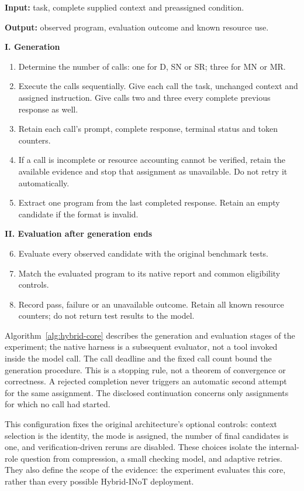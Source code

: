 \begin{algorithm}[htbp]
\caption{Program generation and outcome evaluation}
\label{alg:hybrid-core}
\small
\textbf{Input:} task, complete supplied context and preassigned condition.\par
\textbf{Output:} observed program, evaluation outcome and known resource use.\par\medskip
\textbf{I. Generation}
\begin{enumerate}\setlength{\itemsep}{2pt}\setlength{\parsep}{0pt}
\item Determine the number of calls: one for D, SN or SR; three for MN or MR.
\item Execute the calls sequentially. Give each call the task, unchanged context and assigned instruction. Give calls two and three every complete previous response as well.
\item Retain each call's prompt, complete response, terminal status and token counters.
\item If a call is incomplete or resource accounting cannot be verified, retain the available evidence and stop that assignment as unavailable. Do not retry it automatically.
\item Extract one program from the last completed response. Retain an empty candidate if the format is invalid.
\end{enumerate}
\textbf{II. Evaluation after generation ends}
\begin{enumerate}\setcounter{enumi}{5}\setlength{\itemsep}{2pt}\setlength{\parsep}{0pt}
\item Evaluate every observed candidate with the original benchmark tests.
\item Match the evaluated program to its native report and common eligibility controls.
\item Record pass, failure or an unavailable outcome. Retain all known resource counters; do not return test results to the model.
\end{enumerate}
\end{algorithm}

Algorithm~\ref{alg:hybrid-core} describes the generation and evaluation stages of the experiment; the native harness is a subsequent evaluator, not a tool invoked inside the model call. The call deadline and the fixed call count bound the generation procedure. This is a stopping rule, not a theorem of convergence or correctness. A rejected completion never triggers an automatic second attempt for the same assignment. The disclosed continuation concerns only assignments for which no call had started.

This configuration fixes the original architecture's optional controls: context selection is the identity, the mode is assigned, the number of final candidates is one, and verification-driven reruns are disabled. These choices isolate the internal-role question from compression, a small checking model, and adaptive retries. They also define the scope of the evidence: the experiment evaluates this core, rather than every possible Hybrid-INoT deployment.
